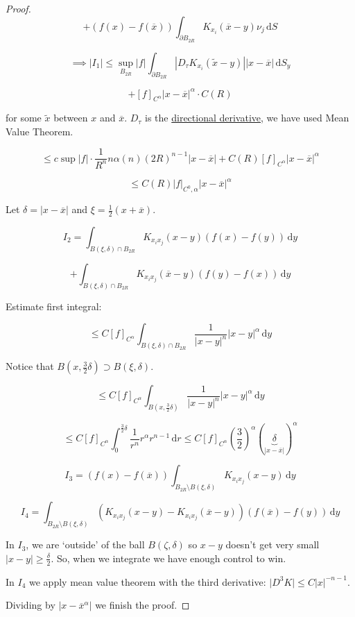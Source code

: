 \documentclass{article}
\theoremstyle{definition}
\begin{document}
\begin{proof}
    \[
        + (f(x) - f(\overline{x})) \int_{\partial B_{2R}} K_{x_i} (\overline{x} - y) \nu_j \,\mathrm{d}S
    \]

    \[
        \implies \vert I_1 \vert \leq \sup_{B_{2R}} \vert f \vert \int_{\partial B_{2R}} \left\vert D_{\tau} K_{x_i} (\widetilde{x} - y) \right\vert \vert x - \overline{x} \vert \,\mathrm{d}S_y 
    \]

    \[
        + [f]_{C^\alpha} \vert x - \overline{x} \vert ^ \alpha \cdot C(R)
    \]

    for some \(\widetilde{x}\) between \(x\) and \(\overline{x}\). \(D_{\tau}\) is the \underline{directional derivative}, we have used Mean Value Theorem.

    \[
        \leq c \sup \vert f \vert \cdot \frac{1}{R^n} n \alpha (n) (2R)^{n-1} \vert x - \overline{x} \vert + C(R) [f]_{C^\alpha} \vert x - \overline{x} \vert ^ \alpha
    \]

    \[
        \leq C(R) \vert f \vert_{C^0,\alpha} \vert x - \overline{x} \vert ^ \alpha
    \]

    Let \(\delta = \vert x - \overline{x} \vert\) and \(\xi = \frac{1}{2}(x + \overline{x})\).
    
    \[
        I_2 = \int_{B(\xi, \delta) \cap B_{2R}} K_{x_i x_j} (x-y) (f(x) - f(y))  \,\mathrm{d}y 
    \]

    \[
        + \int_{B(\xi, \delta) \cap B_{2R}} K_{x_i x_j} (\overline{x} - y) (f(y) -f(x)) \,\mathrm{d}y 
    \]

    Estimate first integral:

    \[
        \leq C[f]_{C^\alpha} \int_{B(\xi, \delta) \cap B_{2R}} \frac{1}{\vert x-y \vert ^ n}\vert x-y \vert ^ \alpha \,\mathrm{d}y 
    \]

    Notice that \(B(x,\frac{3}{2}\delta) \supset B(\xi , \delta)\). 

    \[
        \leq C[f]_{C^\alpha} \int_{B(x, \frac{3}{2}\delta)} \frac{1}{\vert x-y \vert ^ n}\vert x-y \vert ^ \alpha \,\mathrm{d}y 
    \]

    \[
        \leq C[f]_{C^\alpha} \int_{0}^{\frac{3}{2}\delta} \frac{1}{r^n} r^\alpha r^{n-1} \,\mathrm{d}r \leq C[f]_{C^\alpha} \left( \frac{3}{2} \right) ^\alpha  \left( \underbrace{\delta}_{\vert x- \overline{x} \vert } \right) ^\alpha  
    \]

    \[
        I_3 = (f(x)-f(\overline{x})) \int_{B_{2R} \setminus B(\xi, \delta)} K_{x_i x_j} (x-y) \,\mathrm{d}y 
    \]

    \[
        I_4 = \int_{B_{2R} \setminus B(\xi, \delta)} \left( K_{x_i x_j} (x-y) - K_{x_i x_j} (\overline{x} - y) \right) (f(\overline{x})-f(y)) \,\mathrm{d}y 
    \]

    In \(I_3\), we are `outside' of the ball \(B(\zeta , \delta)\) so \(x-y\) doesn't get very small \(\vert x-y \vert \geq \frac{\delta}{2}\). So, when we integrate we have enough control to win.

    In \(I_4\) we apply mean value theorem with the third derivative: \(\vert D^3 K \vert \leq C \vert x \vert ^{-n-1}\).

    Dividing by \(\vert x - \overline{x} ^ \alpha \vert \) we finish the proof.

\end{proof}
\end{document}
